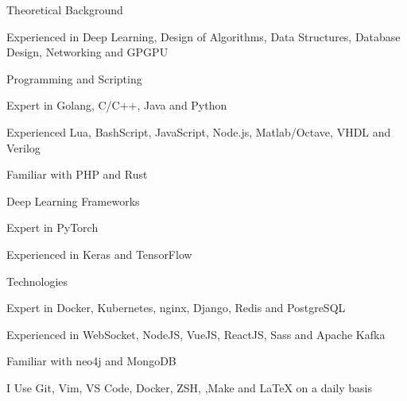 \begin{cventries}
  \cventryshortlist
    {Theoretical Background}
    {
      \begin{cvitems}
        \item {Experienced in Deep Learning, Design of Algorithms, Data Structures, Database Design, Networking and GPGPU}
      \end{cvitems}
    }

  \cventryshortlist
    {Programming and Scripting}
    {
      \begin{cvitems}
        \item {Expert in Golang, C/C++, Java and Python}
        \item {Experienced Lua, BashScript, JavaScript, Node.js, Matlab/Octave, VHDL and Verilog}
        \item {Familiar with PHP and Rust}
      \end{cvitems}
    }

  \cventryshortlist
    {Deep Learning Frameworks}
    {
      \begin{cvitems}
        \item {Expert in PyTorch}
        \item {Experienced in Keras and TensorFlow}
      \end{cvitems}
    }

  \cventryshortlist
    {Technologies}
    {
      \begin{cvitems}
        \item {Expert in Docker, Kubernetes, nginx, Django, Redis and PostgreSQL}
        \item {Experienced in WebSocket, NodeJS, VueJS, ReactJS, Sass and Apache Kafka}
        \item {Familiar with neo4j and MongoDB}
        \item {I Use Git, Vim, VS Code, Docker, ZSH, ,Make and \mbox{\LaTeX} on a daily basis}
      \end{cvitems}
    }


\end{cventries}
